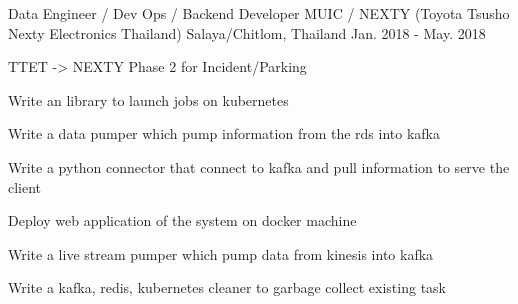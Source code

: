 \begin{cventries}
  \cventry
    {Data Engineer / Dev Ops / Backend Developer} %
    {MUIC / NEXTY (Toyota Tsusho Nexty Electronics Thailand)} %
    {Salaya/Chitlom, Thailand} %
    {Jan. 2018 - May. 2018} %
    {
      \begin{cvitems} %
        \item {TTET -> NEXTY Phase 2 for Incident/Parking}
        \item {Write an library to launch jobs on kubernetes}
        \item {Write a data pumper which pump information from the rds into kafka}
        \item {Write a python connector that connect to kafka and pull information to serve the client}
        \item {Deploy web application of the system on docker machine}
        \item {Write a live stream pumper which pump data from kinesis into kafka}
        \item {Write a kafka, redis, kubernetes cleaner to garbage collect existing task}
      \end{cvitems}
    }
\end{cventries}
